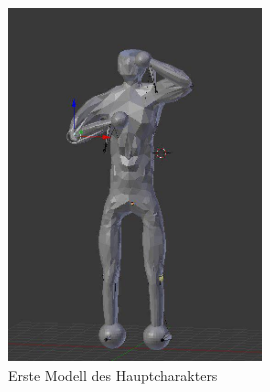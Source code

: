 \documentclass[12pt]{article}
\begin{document}
\begin{figure}
	\centering
	\includegraphics[width=0.6\textwidth]{lowPoly}
	\caption{Erste Modell des Hauptcharakters
		\label{fig:lowpoly}}
\end{figure}
\end{document}
